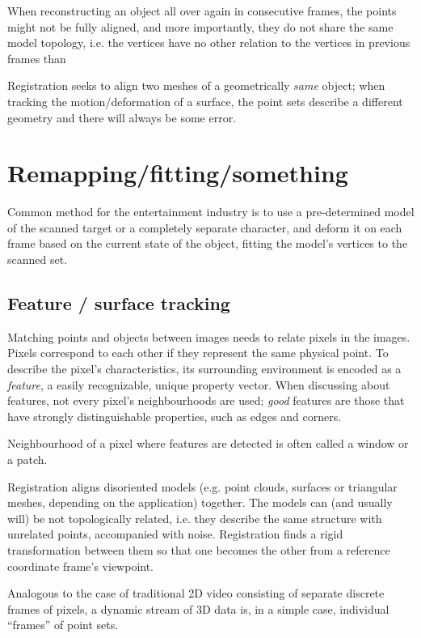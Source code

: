When reconstructing an object all over again in consecutive frames, the points might not be fully aligned, and more importantly, they do not share the same model topology, i.e. the vertices have no other relation to the vertices in previous frames than 

Registration seeks to align two meshes of a geometrically \textit{same} object; when tracking the motion/deformation of a surface, the point sets describe a different geometry and there will always be some error.

\section{Remapping/fitting/something}

Common method for the entertainment industry is to use a pre-determined model of the scanned target or a completely separate character, and deform it on each frame based on the current state of the object, fitting the model's vertices to the scanned set.

\subsection{Feature / surface tracking}

Matching points and objects between images needs to relate pixels in the images.
Pixels correspond to each other if they represent the same physical point.
To describe the pixel's characteristics, its surrounding environment is encoded as a \textit{feature}, a easily recognizable, unique property vector.
When discussing about features, not every pixel's neighbourhoods are used; \textit{good} features are those that have strongly distinguishable properties, such as edges and corners.

Neighbourhood of a pixel where features are detected is often called a window or a patch.

Registration aligns disoriented models (e.g. point clouds, surfaces or triangular meshes, depending on the application) together. The models can (and usually will) be not topologically related, i.e. they describe the same structure with unrelated points, accompanied with noise. Registration finds a rigid transformation between them so that one becomes the other from a reference coordinate frame's viewpoint.

Analogous to the case of traditional 2D video consisting of separate discrete frames of pixels, a dynamic stream of 3D data is, in a simple case, individual ``frames'' of point sets.

